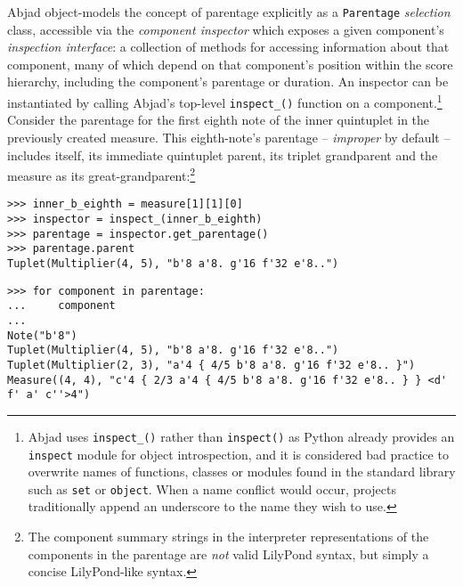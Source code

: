 Abjad object-models the concept of parentage explicitly as a \texttt{Parentage}
\emph{selection} class, accessible via the \emph{component inspector} which
exposes a given component's \emph{inspection interface}: a collection of
methods for accessing information about that component, many of which depend on
that component's position within the score hierarchy, including the component's
parentage or duration. An inspector can be instantiated by calling Abjad's
top-level \texttt{inspect\_()} function on a component.\footnote{Abjad uses
\texttt{inspect\_()} rather than \texttt{inspect()} as Python already provides
an \texttt{inspect} module for object introspection, and it is considered bad
practice to overwrite names of functions, classes or modules found in the
standard library such as \texttt{set} or \texttt{object}. When a name conflict
would occur, projects traditionally append an underscore to the name they wish
to use.} Consider the parentage for the first eighth note of the inner
quintuplet in the previously created measure. This eighth-note's parentage --
\emph{improper} by default -- includes itself, its immediate quintuplet parent,
its triplet grandparent and the  measure as its
great-grandparent:\footnote{The component summary strings in the interpreter
representations of the components in the parentage are \emph{not} valid
LilyPond syntax, but simply a concise LilyPond-like syntax.}

\begin{comment}
<abjad>
inner_b_eighth = measure[1][1][0]
inspector = inspect_(inner_b_eighth)
parentage = inspector.get_parentage()
parentage.parent
for component in parentage:
    component

</abjad>
\end{comment}

\begin{abjadbookoutput}
\begin{singlespacing}
\vspace{-0.5\baselineskip}
\begin{verbatim}
>>> inner_b_eighth = measure[1][1][0]
>>> inspector = inspect_(inner_b_eighth)
>>> parentage = inspector.get_parentage()
>>> parentage.parent
Tuplet(Multiplier(4, 5), "b'8 a'8. g'16 f'32 e'8..")
\end{verbatim}
\begin{verbatim}
>>> for component in parentage:
...     component
...
Note("b'8")
Tuplet(Multiplier(4, 5), "b'8 a'8. g'16 f'32 e'8..")
Tuplet(Multiplier(2, 3), "a'4 { 4/5 b'8 a'8. g'16 f'32 e'8.. }")
Measure((4, 4), "c'4 { 2/3 a'4 { 4/5 b'8 a'8. g'16 f'32 e'8.. } } <d' f' a' c''>4")
\end{verbatim}
\end{singlespacing}
\end{abjadbookoutput}


